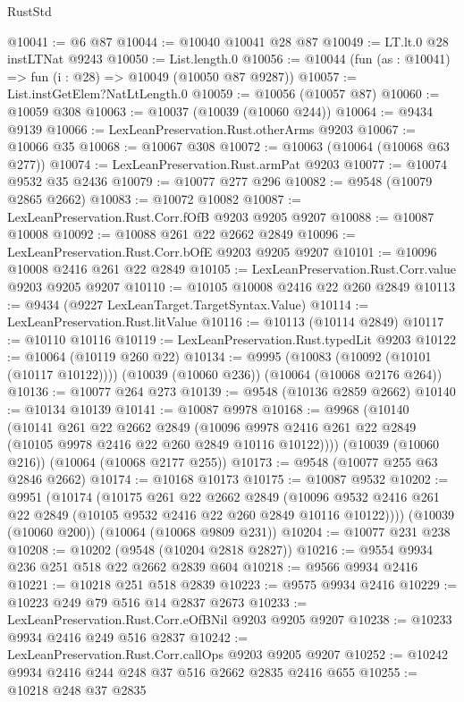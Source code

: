 \begin{lexlean}{RustStd}
\begin{coremodule}
@10041 := @6 @87
@10044 := @10040 @10041 @28 @87
@10049 := LT.lt.{0} @28 instLTNat @9243
@10050 := List.length.{0}
@10056 := @10044 (fun (as : @10041) => fun (i : @28) => @10049 (@10050 @87 @9287))
@10057 := List.instGetElem?NatLtLength.{0}
@10059 := @10056 (@10057 @87)
@10060 := @10059 @308
@10063 := @10037 (@10039 (@10060 @244))
@10064 := @9434 @9139
@10066 := LexLeanPreservation.Rust.otherArms @9203
@10067 := @10066 @35
@10068 := @10067 @308
@10072 := @10063 (@10064 (@10068 @63 @277))
@10074 := LexLeanPreservation.Rust.armPat @9203
@10077 := @10074 @9532 @35 @2436
@10079 := @10077 @277 @296
@10082 := @9548 (@10079 @2865 @2662)
@10083 := @10072 @10082
@10087 := LexLeanPreservation.Rust.Corr.fOfB @9203 @9205 @9207
@10088 := @10087 @10008
@10092 := @10088 @261 @22 @2662 @2849
@10096 := LexLeanPreservation.Rust.Corr.bOfE @9203 @9205 @9207
@10101 := @10096 @10008 @2416 @261 @22 @2849
@10105 := LexLeanPreservation.Rust.Corr.value @9203 @9205 @9207
@10110 := @10105 @10008 @2416 @22 @260 @2849
@10113 := @9434 (@9227 LexLeanTarget.TargetSyntax.Value)
@10114 := LexLeanPreservation.Rust.litValue
@10116 := @10113 (@10114 @2849)
@10117 := @10110 @10116
@10119 := LexLeanPreservation.Rust.typedLit @9203
@10122 := @10064 (@10119 @260 @22)
@10134 := @9995
    (@10083 (@10092 (@10101 (@10117 @10122))))
    (@10039 (@10060 @236))
    (@10064 (@10068 @2176 @264))
@10136 := @10077 @264 @273
@10139 := @9548 (@10136 @2859 @2662)
@10140 := @10134 @10139
@10141 := @10087 @9978
@10168 := @9968
    (@10140
      (@10141
        @261
        @22
        @2662
        @2849
        (@10096 @9978 @2416 @261 @22 @2849 (@10105 @9978 @2416 @22 @260 @2849 @10116 @10122))))
    (@10039 (@10060 @216))
    (@10064 (@10068 @2177 @255))
@10173 := @9548 (@10077 @255 @63 @2846 @2662)
@10174 := @10168 @10173
@10175 := @10087 @9532
@10202 := @9951
    (@10174
      (@10175
        @261
        @22
        @2662
        @2849
        (@10096 @9532 @2416 @261 @22 @2849 (@10105 @9532 @2416 @22 @260 @2849 @10116 @10122))))
    (@10039 (@10060 @200))
    (@10064 (@10068 @9809 @231))
@10204 := @10077 @231 @238
@10208 := @10202 (@9548 (@10204 @2818 @2827))
@10216 := @9554 @9934 @236 @251 @518 @22 @2662 @2839 @604
@10218 := @9566 @9934 @2416
@10221 := @10218 @251 @518 @2839
@10223 := @9575 @9934 @2416
@10229 := @10223 @249 @79 @516 @14 @2837 @2673
@10233 := LexLeanPreservation.Rust.Corr.eOfBNil @9203 @9205 @9207
@10238 := @10233 @9934 @2416 @249 @516 @2837
@10242 := LexLeanPreservation.Rust.Corr.callOps @9203 @9205 @9207
@10252 := @10242 @9934 @2416 @244 @248 @37 @516 @2662 @2835 @2416 @655
@10255 := @10218 @248 @37 @2835

\end{coremodule}
\end{lexlean}
